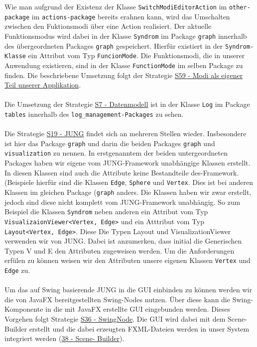 \documentclass[enabledeprecatedfontcommands,fontsize=11pt,paper=a4,twoside]{scrartcl}
\newcounter{one}
\begin{document}
Wie man aufgrund der Existenz der Klasse \texttt{SwitchModiEditorAction} im \texttt{other-package} im \texttt{actions-package} bereits erahnen kann, wird das Umschalten zwischen den Fuktionsmodi über eine Action realisiert. Der aktuelle Funktionsmodus wird dabei in der Klasse \texttt{Syndrom} im Package \texttt{graph} innerhalb des übergeordneten Packages \texttt{graph} gespeichert. Hierfür existiert in der \texttt{Syndrom-Klasse} ein Attribut vom Typ \texttt{FuncionMode}. Die Funktionsmodi, die in unserer Anwendung existieren, sind in der Klasse \texttt{FunctionMode} im selben Package zu finden. Die beschriebene Umsetzung folgt der Strategie \hyperlink{uuu}{S59 - Modi als eigener Teil unserer Applikation}. \\ \\

Die Umsetzung der Strategie \hyperlink{aaa}{S7 - Datenmodell} ist in der Klasse \texttt{Log} im Package \texttt{tables} innerhalb des \texttt{log\_management-Packages} zu sehen. \\ \\

Die Strategie \hyperlink{eee}{S19 - JUNG} findet sich an mehreren Stellen wieder. Insbesondere ist hier das Package \texttt{graph} und darin die beiden Packages \texttt{graph} und \texttt{visualization} zu nennen. In erstgenanntem der beiden untergeordneten Packages haben wir eigene vom JUNG-Framework unabhängige Klassen erstellt. In diesen Klassen sind auch die Attribute keine Bestandteile des-Framework. (Beispiele hierfür sind die Klassen \texttt{Edge}, \texttt{Sphere} und \texttt{Vertex}. Dies ist bei anderen Klassen im gleichen Package (\texttt{graph} anders. Die Klassen haben wir zwar erstellt, jedoch sind diese nicht komplett vom JUNG-Framework unabhängig. So zum Beispiel die Klassen \texttt{Syndrom} neben anderen ein Attribut vom Typ \texttt{VisualizaionViewer<Vertex, Edge>} und ein Atttribut vom Typ \texttt{Layout<Vertex, Edge>}. Diese Die Typen Layout und VisualizationViewer verwenden wir von JUNG. Dabei ist anzumerken, dass initial die Generischen Typen V und E den Attributen zugeweisen werden. Um die Anforderungen erfülen zu können weisen wir den Attributen unsere eigenen Klassen \texttt{Vertex} und \texttt{Edge} zu. \\ \\

Um das auf Swing basierende JUNG in die GUI einbinden zu können werden wir die von JavaFX bereitgestellten Swing-Nodes nutzen. Über diese kann die Swing-Komponente in die mit JavaFX erstellte GUI eingebunden werden. Dieses Vorgehen folgt Strategie \hyperlink{lll}{S36 - SwingNode}. Die GUI wird dabei mit dem Scene-Builder erstellt und die dabei erzeugten FXML-Dateien werden in unser System integriert werden (\hyperlink{mmm}{38 - Scene- Builder}). \\ \\
\end{document}
